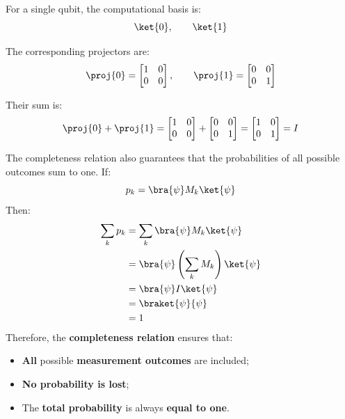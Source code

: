 \begin{examplebox}
    For a single qubit, the computational basis is:
    \begin{equation*}
        \ket{0},
        \qquad
        \ket{1}
    \end{equation*}

    The corresponding projectors are:
    \begin{equation*}
        \proj{0}
        =
        \begin{bmatrix}
            1 & 0 \\
            0 & 0
        \end{bmatrix},
        \qquad
        \proj{1}
        =
        \begin{bmatrix}
            0 & 0 \\
            0 & 1
        \end{bmatrix}
    \end{equation*}

    Their sum is:
    \begin{equation*}
        \proj{0}
        +
        \proj{1}
        =
        \begin{bmatrix}
            1 & 0 \\
            0 & 0
        \end{bmatrix}
        +
        \begin{bmatrix}
            0 & 0 \\
            0 & 1
        \end{bmatrix}
        =
        \begin{bmatrix}
            1 & 0 \\
            0 & 1
        \end{bmatrix}
        =
        I
    \end{equation*}
\end{examplebox}

\noindent
The completeness relation also guarantees that the probabilities of all possible outcomes sum to one. If:
\begin{equation*}
    p_k
    =
    \bra{\psi} M_k \ket{\psi}
\end{equation*}
Then:
\begin{align*}
    \sum_k p_k
    &=
    \sum_k \bra{\psi} M_k \ket{\psi}
    \\
    &=
    \bra{\psi}
    \left(
        \sum_k M_k
    \right)
    \ket{\psi}
    \\
    &=
    \bra{\psi} I \ket{\psi}
    \\
    &=
    \braket{\psi}{\psi}
    \\
    &= 1
\end{align*}
Therefore, the \textbf{completeness relation} ensures that:
\begin{itemize}
    \item \textbf{All} possible \textbf{measurement outcomes} are included;
    \item \textbf{No probability is lost};
    \item The \textbf{total probability} is always \textbf{equal to one}.
\end{itemize}